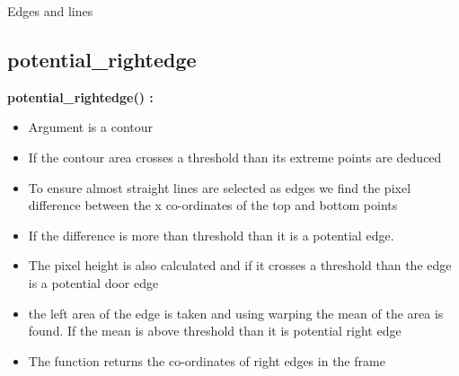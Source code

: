 \documentclass[10pt, a4paper]{beamer}
\begin{document}
\begin{frame}[allowframebreaks]{Edges and lines}
  \subsection{potential\_rightedge}
    \textbf{potential\_rightedge() : }
      \begin{itemize}
       \item Argument is a contour
       \item If the contour area crosses a threshold than its extreme points are deduced
       \item To ensure almost straight lines are selected as edges we find the pixel difference between the x co-ordinates of the top and bottom points
       \item If the difference is more than threshold than it is a potential edge. 
       \item The pixel height is also calculated and if it crosses a threshold than the edge is a potential door edge
       \item the left area of the edge is taken and using warping the mean of the area is found. If the mean is above threshold than it is potential right edge
       \item The function returns the co-ordinates of right edges in the frame
      \end{itemize}
\end{frame}
\end{document}
